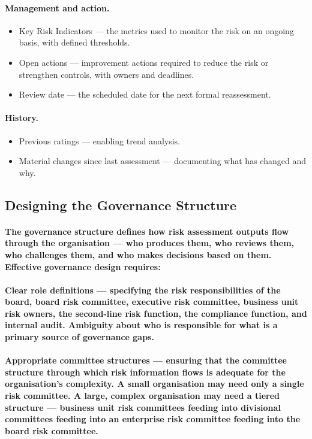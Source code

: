 \paragraph{\textbf{Management and action}.}
\begin{itemize}
  \item{Key Risk Indicators — the metrics used to monitor the risk on an ongoing basis, with defined thresholds.}
  \item{Open actions — improvement actions required to reduce the risk or strengthen controls, with owners and deadlines.}
  \item{Review date — the scheduled date for the next formal reassessment.}
\end{itemize}

\paragraph{\textbf{History}.}
\begin{itemize}
  \item{Previous ratings — enabling trend analysis.}
  \item{Material changes since last assessment — documenting what has changed and why.}
\end{itemize}

\subsection{Designing the Governance Structure}
\paragraph{The governance structure defines how risk assessment outputs flow through the organisation — who produces them, who reviews them, who challenges them, and who makes decisions based on them. Effective governance design requires:}
\paragraph{\textbf{Clear role definitions} — specifying the risk responsibilities of the board, board risk committee, executive risk committee, business unit risk owners, the second-line risk function, the compliance function, and internal audit. Ambiguity about who is responsible for what is a primary source of governance gaps.}
\paragraph{\textbf{Appropriate committee structures} — ensuring that the committee structure through which risk information flows is adequate for the organisation's complexity. A small organisation may need only a single risk committee. A large, complex organisation may need a tiered structure — business unit risk committees feeding into divisional committees feeding into an enterprise risk committee feeding into the board risk committee.}
